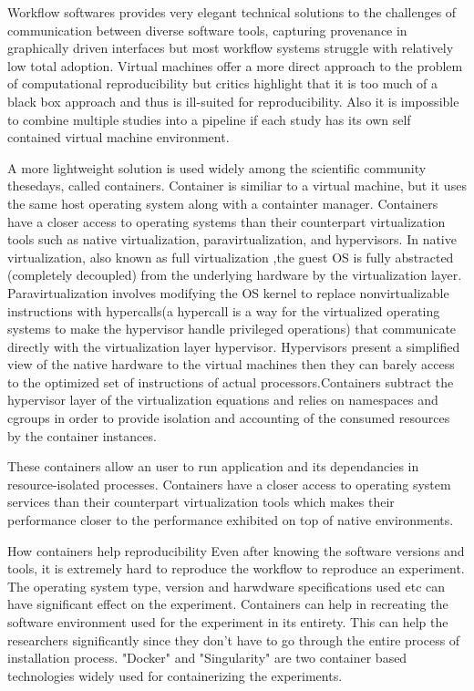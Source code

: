 Workflow softwares provides very elegant technical solutions to the challenges of communication between diverse software tools, capturing provenance in graphically driven interfaces but most workflow systems struggle with relatively low total adoption. Virtual machines offer a more direct approach to the problem of computational reproducibility but critics highlight that it is too much of a black box approach and thus is ill-suited for reproducibility. Also it is impossible to combine multiple studies into a pipeline if each study has its own self contained virtual machine environment\cite{Boettiger:2015:IDR:2723872.2723882}.

A more lightweight solution is used widely among the scientific community thesedays, called containers. Container is similiar to a virtual machine, but it uses the same host operating system along with a containter manager. Containers have a closer access to operating systems than their counterpart virtualization tools such as native virtualization, paravirtualization, and hypervisors. In native virtualization, also known as full virtualization ,the guest OS is fully abstracted (completely decoupled) from the underlying hardware by the virtualization layer. Paravirtualization involves modifying the OS kernel to replace nonvirtualizable instructions with hypercalls(a hypercall is a way for the virtualized operating systems to make the hypervisor handle privileged operations) that communicate directly with the virtualization layer hypervisor\cite{citeulike:11530382}. Hypervisors present a simplified view of the native hardware to the virtual machines then they can barely access to the optimized set of instructions of actual processors.Containers subtract the hypervisor layer of the virtualization equations and relies on namespaces and cgroups in order to provide isolation and accounting of the consumed resources by the container instances.

These containers allow an user to run application and its dependancies in resource-isolated processes. Containers have a closer access to operating system services than their counterpart virtualization tools which makes their performance closer to the performance exhibited on top of native environments\cite{Xavier:2013:PEC:2497369.2497577}.

How containers help reproducibility
Even after knowing the software versions and tools, it is extremely hard to reproduce the workflow to reproduce an experiment. The operating system type, version and harwdware specifications used etc can have significant effect on the experiment. Containers can help in recreating the software environment used for the experiment in its entirety. This can help the researchers significantly since they don't have to go through the entire process of installation process. "Docker" and "Singularity" are two container based technologies widely used for containerizing the experiments.

